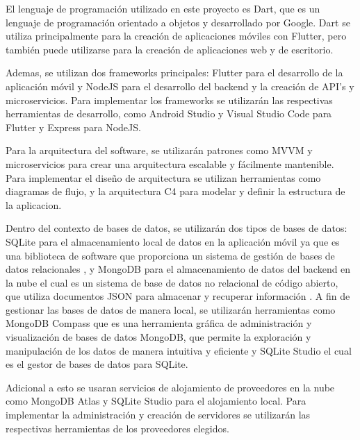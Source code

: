 \documentclass[runningheads]{llncs}
\begin{document}
El lenguaje de programación utilizado en este proyecto es Dart, que es un lenguaje de programación orientado a objetos y desarrollado por Google. Dart se utiliza principalmente para la creación de aplicaciones móviles con Flutter, pero también puede utilizarse para la creación de aplicaciones web y de escritorio. 

Ademas, se utilizan dos frameworks principales: Flutter para el desarrollo de la aplicación móvil y NodeJS para el desarrollo del backend y la creación de API's y microservicios. Para implementar los frameworks se utilizarán las respectivas herramientas de desarrollo, como Android Studio y Visual Studio Code para Flutter y Express para NodeJS. 

Para la arquitectura del software, se utilizarán patrones como MVVM y microservicios para crear una arquitectura escalable y fácilmente mantenible. Para implementar el diseño de arquitectura se utilizan herramientas como diagramas de flujo, y la arquitectura C4 para modelar y definir la estructura de la aplicacion.

Dentro del contexto de bases de datos, se utilizarán dos tipos de bases de datos: SQLite para el almacenamiento local de datos en la aplicación móvil ya que es una biblioteca de software que proporciona un sistema de gestión de bases de datos relacionales \cite{Cita17}, y MongoDB para el almacenamiento de datos del backend en la nube el cual es un sistema de base de datos no relacional de código abierto, que utiliza documentos JSON para almacenar y recuperar información \cite{Cita18}. A fin de gestionar las bases de datos de manera local, se utilizarán herramientas como MongoDB Compass que es una herramienta gráfica de administración y visualización de bases de datos MongoDB, que permite la exploración y manipulación de los datos de manera intuitiva y eficiente y SQLite Studio el cual es el gestor de bases de datos para SQLite.

Adicional a esto se usaran servicios de alojamiento de proveedores en la nube como MongoDB Atlas y SQLite Studio para el alojamiento local. Para implementar la administración y creación de servidores se utilizarán las respectivas herramientas de los proveedores elegidos.



\end{document}
